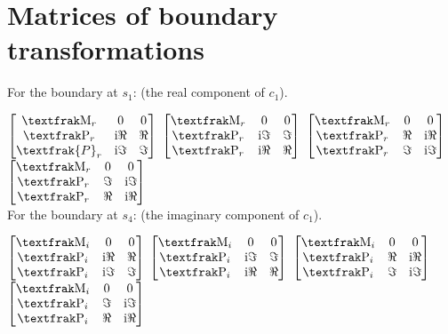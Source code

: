 \documentclass[]{iucr}              %
\numberwithin{equation}{section}
\begin{document}
	\section{Matrices of boundary transformations}
	
	For the boundary at $s_1$: (the real component of $c_1$).
	
	$\begin{bmatrix}
	\Minus{}_r		& 0					& 0 \\
	\Plus{}_r		&  \textrm{i}\Re{}	& \Re{} \\
	\textfrak{P}_r	& \textrm{i}\Im{}	& \Im{}
	\end{bmatrix}$
	$\begin{bmatrix}
	\Minus{}_r	& 0 				& 0 \\
	\Plus{}_r	&\textrm{i}\Im{}	& \Im{} \\
	\Plus{}_r	& \textrm{i}\Re{}	& \Re{} \\
	\end{bmatrix}$ 
	$\begin{bmatrix}
	\Minus{}_r	& 0			& 0 \\
	\Plus{}_r	&  \Re{}	& \textrm{i}\Re{} \\
	\Plus{}_r	& \Im{}		&\textrm{i}\Im{}
	\end{bmatrix}	$
	$\begin{bmatrix}
	\Minus{}_r	& 0			& 0 \\
	\Plus{}_r	& \Im{}		&\textrm{i}\Im{} \\
	\Plus{}_r	&  \Re{}	&\textrm{i}\Re{} \\
	\end{bmatrix}$ \\
	
	For the boundary at $s_4$: (the imaginary component of $c_1$).
	
	$\begin{bmatrix}
	\Minus{}_i	& 0					& 0 \\
	\Plus{}_i	&  \textrm{i}\Re{}	& \Re{} \\
	\Plus{}_i	& \textrm{i}\Im{}	& \Im{}
	\end{bmatrix}$
	$\begin{bmatrix}
	\Minus{}_i	& 0					& 0 \\
	\Plus{}_i	& \textrm{i}\Im{}	& \Im{} \\
	\Plus{}_i	&  \textrm{i}\Re{}	& \Re{} \\
	\end{bmatrix}$ 
	$\begin{bmatrix}
	\Minus{}_i	& 0			& 0 \\
	\Plus{}_i	&  \Re{}	& \textrm{i}\Re{} \\
	\Plus{}_i	& \Im{}		& \textrm{i}\Im{}
	\end{bmatrix}	$
	$\begin{bmatrix}
	\Minus{}_i	& 0		& 0 \\
	\Plus{}_i	& \Im{}	& \textrm{i}\Im{} \\
	\Plus{}_i	&  \Re{}& \textrm{i}\Re{} \\
\end{bmatrix}$ \\
\end{document}
